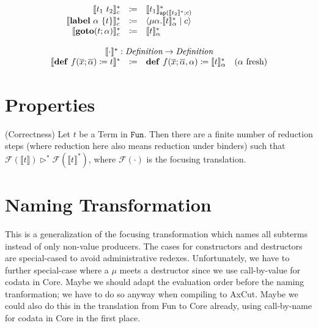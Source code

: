 \documentclass[nonacm]{acmart}
\newcommand{\translate}[1]{\ensuremath{\llbracket #1 \rrbracket}}
\newcommand{\cut}[2]{\ensuremath{\langle #1 \mid #2 \rangle}}
\newcommand{\goto}[2]{\ensuremath{\mathbf{goto}(#1; #2)}}
\newcommand{\lab}[2]{\ensuremath{\mathbf{label}\ #1\ \{#2 \}}}
\newcommand{\defi}[2]{\ensuremath{\mathbf{def}\ #1 \coloneq #2}}
\newcommand{\translatestar}[2]{\ensuremath{\llbracket #1 \rrbracket_{#2}^{\ast}}}
\newcommand{\reducesto}{\ensuremath{\triangleright}}
\newcommand{\focus}[1]{\ensuremath{\mathcal{F}(#1)}}
\newcommand{\fresh}[1]{\ensuremath{(#1\text{ fresh})}}
\begin{document}
\[\begin{array}{rcll}
    \translatestar{t_1\ t_2}{c} & \coloneq & \translatestar{t_1}{\mathtt{ap}(\translatestar{t_2}{}; c)} & \\
    \translatestar{\lab{\alpha}{t}}{c} & \coloneq & \cut{\mu \alpha.\translatestar{t}{\alpha}}{c} & \\
    \translatestar{\goto{t}{\alpha}}{c} & \coloneq & \translatestar{t}{\alpha} & \\
    \\
    \multicolumn{4}{c}{\translatestar{\cdot}{} : \emph{Definition} \rightarrow \emph{Definition}}\\
    \translatestar{\defi{f(\overline{x}; \overline{\alpha})}{t}}{} & \coloneq & \defi{f(\overline{x}; \overline{\alpha}, \alpha)}{\translatestar{t}{\alpha}} & \fresh{\alpha}
  \end{array}
\]

\section{Properties}
\label{sec:Properties}

\begin{theorem} (Correctness)
  Let $t$ be a Term in $\mathtt{Fun}$. Then there are a finite number of reduction steps (where reduction here also means reduction under binders) such that $\focus{\translate{t}} \reducesto^{\ast} \focus{\translatestar{t}{}}$, where $\focus{\cdot}$ is the focusing translation.
\end{theorem}

\section{Naming Transformation}
\label{sec:naming-transformation}

This is a generalization of the focusing transformation which names all subterms instead of only non-value producers.
The cases for constructors and destructors are special-cased to avoid administrative redexes.
Unfortunately, we have to further special-case where a $\mu$ meets a destructor since we use call-by-value for codata in Core.
Maybe we should adapt the evaluation order before the naming tranformation; we have to do so anyway when compiling to AxCut.
Maybe we could also do this in the translation from Fun to Core already, using call-by-name for codata in Core in the first place.
\end{document}
